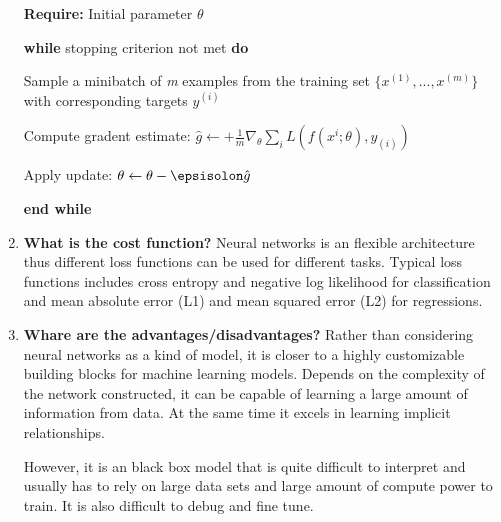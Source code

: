 \documentclass{article}
\begin{document}
\begin{enumerate}
    \textbf{Require:} Initial parameter $\theta$
    
    \qquad \textbf{while} stopping criterion not met \textbf{do}
    
    \qquad \qquad Sample a minibatch of \emph{m} examples from the training set $\{x^{(1)}, ..., x^{(m)}\}$ with corresponding targets $y^{(i)}$
    
    \qquad \qquad Compute gradent estimate: $\hat g \leftarrow + \frac{1}{m}\nabla_{\theta}\sum_{i} L(f(x^{i};\theta),y_{(i)})$
    
    \qquad \qquad Apply update: $\theta \leftarrow \theta - \epsisolon\hat g$
    
    \qquad \textbf{end while}
    \smallbreak
    \hline

    \item \textbf{What is the cost function?}
    \noindent 
    \smallbreak
    Neural networks is an flexible architecture thus different loss functions can be used for different tasks. Typical loss functions includes cross entropy and negative log likelihood for classification and mean absolute error (L1) and mean squared error (L2) for regressions.
    
    \item \textbf{Whare are the advantages/disadvantages?}
    \noindent 
    \smallbreak
    Rather than considering neural networks as a kind of model, it is closer to a highly customizable building blocks for machine learning models. Depends on the complexity of the network constructed, it can be capable of learning a large amount of information from data. At the same time it excels in learning implicit relationships. 
    
    However, it is an black box model that is quite difficult to interpret and usually has to rely on large data sets and large amount of compute power to train. It is also difficult to debug and fine tune.
    
\end{enumerate}
\end{document}
